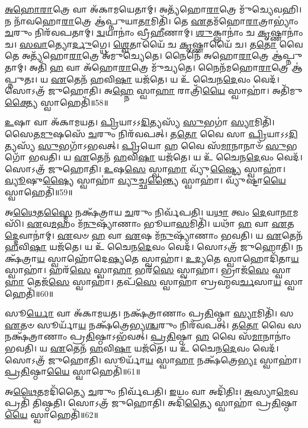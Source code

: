 \-\ul{𑌅}\-\-\ul{𑌹𑍋}\-\-\ul{𑌰𑌾}\-𑌤𑍍𑌰𑍇 𑌵𑌾 𑌅᳴𑌕𑌾𑌮𑌯𑍇𑌤𑌾𑌮𑍍।
𑌅𑌤𑍍𑌯᳴𑌹𑍋\-\ul{𑌰𑌾}\-𑌤𑍍𑌰𑍇 𑌮𑍁᳴𑌚𑍍𑌯𑍇𑌵𑌹𑌿।
𑌨 𑌨𑌾᳴𑌵𑌹𑍋\-\ul{𑌰𑌾}\-𑌤𑍍𑌰𑍇 𑌆॑𑌪𑍍𑌨𑍁𑌯𑌾\-\ul{𑌤𑌾}\-𑌮𑌿𑌤𑌿᳴।
𑌤𑍇 \ul{𑌏}\-𑌤𑌮᳴𑌹𑍋\-\ul{𑌰𑌾}\-𑌤𑍍𑌰𑌾𑌭𑍍𑌯𑌾𑌂॑ \ul{𑌚}\-𑌰𑍁𑌂 𑌨𑌿𑌰᳴𑌵𑌪𑌤𑌾𑌮𑍍।
\-\ul{𑌦𑍍𑌵}\-𑌯𑌾𑌨𑌾𑌂॑ 𑌵𑍍𑌰𑍀\-\ul{𑌹𑍀}\-𑌣𑌾𑌮𑍍।
\-\ul{𑌶𑍁}\-𑌕𑍍𑌲𑌾𑌨𑌾𑌂॑ 𑌚 \ul{𑌕𑍃}\-𑌷𑍍𑌣𑌾𑌨𑌾𑌂॑ 𑌚।
\-\ul{𑌸}\-\-\ul{𑌵𑌾}\-𑌤𑍍𑌯𑍋\-\ul{𑌰𑍍𑌦𑍁}\-𑌗𑍍𑌧𑍇।
\-\ul{𑌶𑍍𑌵𑍇}\-𑌤𑌾𑌯𑍈᳴ 𑌚 \ul{𑌕𑍃}\-𑌷𑍍𑌣𑌾𑌯𑍈᳴ 𑌚।
𑌤\-\ul{𑌤𑍋} 𑌵𑍈 𑌤𑍇 𑌅𑌤𑍍𑌯᳴𑌹𑍋\-\ul{𑌰𑌾}\-𑌤𑍍𑌰𑍇 𑌅᳴𑌮𑍁𑌚𑍍𑌯𑍇𑌤𑍇।
𑌨𑍈𑌨𑍇᳴ 𑌅𑌹𑍋\-\ul{𑌰𑌾}\-𑌤𑍍𑌰𑍇 𑌆॑𑌪𑍍𑌨𑍁𑌤𑌾𑌮𑍍।
𑌅𑌤𑌿᳴ \ul{𑌹} 𑌵𑌾 𑌅᳴𑌹𑍋\-\ul{𑌰𑌾}\-𑌤𑍍𑌰𑍇 𑌮𑍁᳴𑌚𑍍𑌯𑌤𑍇।
𑌨𑍈𑌨᳴𑌮𑌹𑍋\-\ul{𑌰𑌾}\-𑌤𑍍𑌰𑍇 𑌆॑𑌪𑍍𑌨𑍁𑌤𑌃।
𑌯 \ul{𑌏}\-𑌤𑍇𑌨᳴ \ul{𑌹}\-𑌵𑌿\-\ul{𑌷𑌾} 𑌯𑌜᳴𑌤𑍇।
𑌯 𑌉᳴ 𑌚𑍈𑌨\-\ul{𑌦𑍇}\-𑌵𑌂 𑌵𑍇𑌦᳴।
𑌸𑍋𑌽𑌤𑍍𑌰᳴ 𑌜𑍁𑌹𑍋𑌤𑌿।
𑌅\-\ul{𑌹𑍍𑌨𑍇} 𑌸𑍍𑌵𑌾\-\ul{𑌹𑌾} 𑌰𑌾𑌤𑍍𑌰𑌿᳴\-\ul{𑌯𑍈} 𑌸𑍍𑌵𑌾𑌹𑌾॑।
𑌅𑌤𑌿᳴𑌮𑍁\-\ul{𑌕𑍍𑌤𑍍𑌯𑍈} 𑌸𑍍𑌵𑌾𑌹𑍇𑌤𑌿᳴॥58॥

\-\ul{𑌉}\-𑌷𑌾 𑌵𑌾 𑌅᳴𑌕𑌾𑌮𑌯𑌤।
\-\ul{𑌪𑍍𑌰𑌿}\-𑌯𑌾\-𑌽𑌽\-\ul{𑌦𑌿}\-𑌤𑍍𑌯𑌸𑍍𑌯᳴ \ul{𑌸𑍁}\-𑌭𑌗𑌾॑ \ul{𑌸𑍍𑌯𑌾}\-𑌮𑌿𑌤𑌿᳴।
𑌸𑍈𑌤\-\ul{𑌮𑍁}\-𑌷𑌸𑍇᳴ \ul{𑌚}\-𑌰𑍁𑌂 𑌨𑌿𑌰᳴𑌵𑌪𑌤𑍍।
𑌤\-\ul{𑌤𑍋} 𑌵𑍈 𑌸𑌾 \ul{𑌪𑍍𑌰𑌿}\-𑌯𑌾\-𑌽𑌽\-\ul{𑌦𑌿}\-𑌤𑍍𑌯𑌸𑍍𑌯᳴ \ul{𑌸𑍁}\-𑌭𑌗𑌾᳴\-𑌽𑌭𑌵𑌤𑍍।
\-\ul{𑌪𑍍𑌰𑌿}\-𑌯𑍋 \ul{𑌹} 𑌵𑍈 𑌸᳴\-\ul{𑌮𑌾}\-𑌨𑌾𑌨𑌾𑍞᳴ \ul{𑌸𑍁}\-𑌭𑌗𑍋᳴ 𑌭𑌵𑌤𑌿।
𑌯 \ul{𑌏}\-𑌤𑍇𑌨᳴ \ul{𑌹}\-𑌵𑌿\-\ul{𑌷𑌾} 𑌯𑌜᳴𑌤𑍇।
𑌯 𑌉᳴ 𑌚𑍈𑌨\-\ul{𑌦𑍇}\-𑌵𑌂 𑌵𑍇𑌦᳴।
𑌸𑍋𑌽𑌤𑍍𑌰᳴ 𑌜𑍁𑌹𑍋𑌤𑌿।
\-\ul{𑌉}\-𑌷\-\ul{𑌸𑍇} 𑌸𑍍𑌵𑌾\-\ul{𑌹𑌾} 𑌵𑍍𑌯𑍁᳴\-\ul{𑌷𑍍𑌟𑍍𑌯𑍈} 𑌸𑍍𑌵𑌾𑌹𑌾॑।
\-\ul{𑌵𑍍𑌯𑍂}\-𑌷𑍁\-\ul{𑌷𑍍𑌯𑍈} 𑌸𑍍𑌵𑌾𑌹𑌾॑ \ul{𑌵𑍍𑌯𑍁}\-𑌚𑍍𑌛\-\ul{𑌨𑍍𑌤𑍍𑌯𑍈} 𑌸𑍍𑌵𑌾𑌹𑌾॑।
𑌵𑍍𑌯𑍁᳴𑌷𑍍𑌟𑌾\-\ul{𑌯𑍈} 𑌸𑍍𑌵𑌾𑌹𑍇𑌤𑌿᳴॥59॥

𑌅\-\ul{𑌥𑍈}\-𑌤\-\ul{𑌸𑍍𑌮𑍈} 𑌨𑌕𑍍𑌷᳴𑌤𑍍𑌰𑌾𑌯 \ul{𑌚}\-𑌰𑍁𑌂 𑌨𑌿𑌰𑍍𑌵᳴𑌪𑌤𑌿।
𑌯\-\ul{𑌥𑌾} 𑌤𑍍𑌵𑌂 \ul{𑌦𑍇}\-𑌵𑌾\-\ul{𑌨𑌾}\-𑌮𑌸𑌿᳴।
\-\ul{𑌏}\-𑌵\-\ul{𑌮}\-𑌹𑌂 𑌮᳴\-\ul{𑌨𑍁}\-𑌷𑍍𑌯𑌾᳴𑌣𑌾𑌂 𑌭𑍂𑌯𑌾\-\ul{𑌸}\-𑌮𑌿𑌤𑌿᳴।
𑌯𑌥𑌾᳴ \ul{𑌹} 𑌵𑌾 \ul{𑌏}\-𑌤\-\ul{𑌦𑍍𑌦𑍇}\-𑌵𑌾𑌨𑌾॑𑌮𑍍।
\-\ul{𑌏}\-𑌵𑍞 \ul{𑌹} 𑌵𑌾 \ul{𑌏}\-𑌷 𑌮᳴\-\ul{𑌨𑍁}\-𑌷𑍍𑌯𑌾᳴𑌣𑌾𑌂 𑌭𑌵𑌤𑌿।
𑌯 \ul{𑌏}\-𑌤𑍇𑌨᳴ \ul{𑌹}\-𑌵𑌿\-\ul{𑌷𑌾} 𑌯𑌜᳴𑌤𑍇।
𑌯 𑌉᳴ 𑌚𑍈𑌨\-\ul{𑌦𑍇}\-𑌵𑌂 𑌵𑍇𑌦᳴।
𑌸𑍋𑌽𑌤𑍍𑌰᳴ 𑌜𑍁𑌹𑍋𑌤𑌿।
𑌨𑌕𑍍𑌷᳴𑌤𑍍𑌰𑌾\-\ul{𑌯} 𑌸𑍍𑌵𑌾𑌹𑍋᳴𑌦𑍇\-\ul{𑌷𑍍𑌯}\-𑌤𑍇 𑌸𑍍𑌵𑌾𑌹𑌾॑।
\-\ul{𑌉}\-\-\ul{𑌦𑍍𑌯}\-𑌤𑍇 𑌸𑍍𑌵𑌾𑌹𑍋𑌦𑌿᳴𑌤𑌾\-\ul{𑌯} 𑌸𑍍𑌵𑌾𑌹𑌾॑।
𑌹𑌰᳴\-\ul{𑌸𑍇} 𑌸𑍍𑌵𑌾\-\ul{𑌹𑌾} 𑌭𑌰᳴\-\ul{𑌸𑍇} 𑌸𑍍𑌵𑌾𑌹𑌾॑।
𑌭𑍍𑌰𑌾𑌜᳴\-\ul{𑌸𑍇} 𑌸𑍍𑌵𑌾\-\ul{𑌹𑌾} 𑌤𑍇𑌜᳴\-\ul{𑌸𑍇} 𑌸𑍍𑌵𑌾𑌹𑌾॑।
𑌤𑌪᳴\-\ul{𑌸𑍇} 𑌸𑍍𑌵𑌾𑌹𑌾॑ 𑌬𑍍𑌰𑌹𑍍𑌮𑌵\-\ul{𑌰𑍍𑌚}\-𑌸𑌾\-\ul{𑌯} 𑌸𑍍𑌵𑌾𑌹𑍇𑌤𑌿᳴॥60॥

𑌸𑍂\-\ul{𑌰𑍍𑌯𑍋} 𑌵𑌾 𑌅᳴𑌕𑌾𑌮𑌯𑌤।
𑌨𑌕𑍍𑌷᳴𑌤𑍍𑌰𑌾𑌣𑌾𑌂 𑌪𑍍𑌰\-\ul{𑌤𑌿}\-𑌷𑍍𑌠𑌾 \ul{𑌸𑍍𑌯𑌾}\-𑌮𑌿𑌤𑌿᳴।
𑌸 \ul{𑌏}\-𑌤𑍞 𑌸𑍂𑌰𑍍𑌯𑌾᳴\-\ul{𑌯} 𑌨𑌕𑍍𑌷᳴𑌤𑍍𑌰𑍇𑌭𑍍𑌯\-\ul{𑌶𑍍𑌚}\-𑌰𑍁𑌂 𑌨𑌿𑌰᳴𑌵𑌪𑌤𑍍।
𑌤\-\ul{𑌤𑍋} 𑌵𑍈 𑌸 𑌨𑌕𑍍𑌷᳴𑌤𑍍𑌰𑌾𑌣𑌾𑌂 𑌪𑍍𑌰\-\ul{𑌤𑌿}\-𑌷𑍍𑌠𑌾\-𑌽𑌭᳴𑌵𑌤𑍍।
\-\ul{𑌪𑍍𑌰}\-\-\ul{𑌤𑌿}\-𑌷𑍍𑌠𑌾 \ul{𑌹} 𑌵𑍈 𑌸᳴\-\ul{𑌮𑌾}\-𑌨𑌾𑌨𑌾𑌂॑ 𑌭𑌵𑌤𑌿।
𑌯 \ul{𑌏}\-𑌤𑍇𑌨᳴ \ul{𑌹}\-𑌵𑌿\-\ul{𑌷𑌾} 𑌯𑌜᳴𑌤𑍇।
𑌯 𑌉᳴ 𑌚𑍈𑌨\-\ul{𑌦𑍇}\-𑌵𑌂 𑌵𑍇𑌦᳴।
𑌸𑍋𑌽𑌤𑍍𑌰᳴ 𑌜𑍁𑌹𑍋𑌤𑌿।
𑌸𑍂𑌰𑍍𑌯𑌾᳴\-\ul{𑌯} 𑌸𑍍𑌵𑌾\-\ul{𑌹𑌾} 𑌨𑌕𑍍𑌷᳴𑌤𑍍𑌰𑍇\-\ul{𑌭𑍍𑌯𑌃} 𑌸𑍍𑌵𑌾𑌹𑌾॑।
\-\ul{𑌪𑍍𑌰}\-\-\ul{𑌤𑌿}\-𑌷𑍍𑌠𑌾\-\ul{𑌯𑍈} 𑌸𑍍𑌵𑌾𑌹𑍇𑌤𑌿᳴॥61॥

𑌅\-\ul{𑌥𑍈}\-𑌤𑌮𑌦𑌿᳴𑌤𑍍𑌯𑍈 \ul{𑌚}\-𑌰𑍁𑌂 𑌨𑌿𑌰𑍍𑌵᳴𑌪𑌤𑌿।
\-\ul{𑌇}\-𑌯𑌂 𑌵𑌾 𑌅𑌦𑌿᳴𑌤𑌿𑌃।
\-\ul{𑌅}\-𑌸𑍍𑌯𑌾\-\ul{𑌮𑍇}\-𑌵 𑌪𑍍𑌰𑌤𑌿᳴ 𑌤𑌿𑌷𑍍𑌠𑌤𑌿।
𑌸𑍋𑌽𑌤𑍍𑌰᳴ 𑌜𑍁𑌹𑍋𑌤𑌿।
𑌅𑌦𑌿᳴\-\ul{𑌤𑍍𑌯𑍈} 𑌸𑍍𑌵𑌾𑌹𑌾॑ 𑌪𑍍𑌰\-\ul{𑌤𑌿}\-𑌷𑍍𑌠𑌾\-\ul{𑌯𑍈} 𑌸𑍍𑌵𑌾𑌹𑍇𑌤𑌿᳴॥62॥

